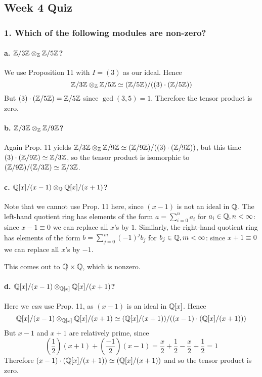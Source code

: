 \subsection[Quiz]{Week 4 Quiz}
\subsubsection*{1. Which of the following modules are non-zero?}
\paragraph*{a. $\mathbb{Z} / 3\mathbb{Z} \otimes_{\mathbb{Z}} \mathbb{Z} / 5\mathbb{Z}$?}
We use Proposition 11 with $I = (3)$ as our ideal. Hence \[\mathbb{Z} / 3\mathbb{Z} \otimes_{\mathbb{Z}} \mathbb{Z} / 5\mathbb{Z} \simeq (\mathbb{Z} / 5\mathbb{Z}) / ((3) \cdot (\mathbb{Z} / 5\mathbb{Z}))\] But $(3) \cdot (\mathbb{Z} / 5\mathbb{Z}) = \mathbb{Z} / 5\mathbb{Z}$ since $\gcd(3, 5) = 1$. Therefore the tensor product is zero.

\paragraph*{b. $\mathbb{Z} / 3\mathbb{Z} \otimes_{\mathbb{Z}} \mathbb{Z} / 9\mathbb{Z}$?}
Again Prop. 11 yields $\mathbb{Z} / 3\mathbb{Z} \otimes_{\mathbb{Z}} \mathbb{Z} / 9\mathbb{Z} \simeq (\mathbb{Z} / 9\mathbb{Z}) / ((3) \cdot (\mathbb{Z} / 9\mathbb{Z}))$, but this time $(3) \cdot (\mathbb{Z} / 9\mathbb{Z}) \simeq \mathbb{Z} / 3\mathbb{Z}$, so the tensor product is isomorphic to $(\mathbb{Z} / 9\mathbb{Z}) / (\mathbb{Z} / 3\mathbb{Z}) \simeq \mathbb{Z} / 3\mathbb{Z}$.

\paragraph*{c. $\mathbb{Q}[x] / (x - 1) \otimes_{\mathbb{Q}} \mathbb{Q}[x] / (x + 1)$?}
Note that we cannot use Prop. 11 here, since $(x - 1)$ is not an ideal in $\mathbb{Q}$. The left-hand quotient ring has elements of the form $a = \sum_{i=0}^n a_i$ for $a_i \in \mathbb{Q}, n < \infty$: since $x - 1 \equiv 0$ we can replace all $x$'s by $1$. Similarly, the right-hand quotient ring has elements of the form $b = \sum_{j=0}^{m} (-1)^j b_j$ for $b_j \in \mathbb{Q}, m < \infty$: since $x + 1 \equiv 0$ we can replace all $x$'s by $-1$.

This comes out to $\mathbb{Q} \times \mathbb{Q}$, which is nonzero.

\paragraph*{d. $\mathbb{Q}[x] / (x - 1) \otimes_{\mathbb{Q}[x]} \mathbb{Q}[x] / (x + 1)$?}
Here we \emph{can} use Prop. 11, as $(x - 1)$ is an ideal in $\mathbb{Q}[x]$. Hence \[\mathbb{Q}[x] / (x - 1) \otimes_{\mathbb{Q}[x]} \mathbb{Q}[x] / (x + 1) \simeq  (\mathbb{Q}[x] / (x + 1)) / ((x - 1) \cdot (\mathbb{Q}[x] / (x + 1)))\] But $x - 1$ and $x + 1$ are relatively prime, since \[\left(\frac{1}{2}\right)(x + 1) + \left(\frac{-1}{2}\right)(x - 1) = \frac{x}{2} + \frac{1}{2} - \frac{x}{2} + \frac{1}{2} = 1\] Therefore $(x - 1) \cdot (\mathbb{Q}[x] / (x + 1)) \simeq (\mathbb{Q}[x] / (x + 1))$ and so the tensor product is zero.

